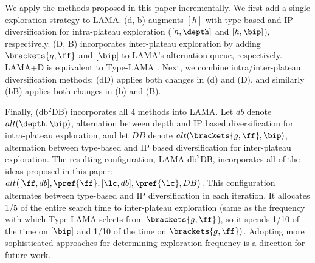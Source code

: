 
We apply the methods proposed in this paper incrementally.
We first add a single exploration strategy to LAMA.
(d, b) augments $[h]$ with type-based and IP diversification for intra-plateau exploration ($[h,\depth]$ and $[h,\bip]$), respectively.
(D, B) incorporates inter-plateau exploration by adding $\brackets{g,\ff}$ and $[\bip]$ to LAMA's alternation queue, respectively.
LAMA+D is equivalent to Type-LAMA \cite{xie14type}.
Next, we combine intra/inter-plateau diversification methods:
(dD) applies both changes in (d) and (D), and similarly (bB) applies both changes in (b) and (B).

Finally, (db$^2$DB) incorporates all 4 methods into LAMA.
Let $db$ denote $alt(\depth,\bip)$, alternation between depth and IP based diversification for intra-plateau exploration,
and let $DB$ denote $alt(\brackets{g,\ff},\bip)$, alternation between type-based and IP based diversification for inter-plateau exploration.
The resulting configuration,
LAMA-db$^2$DB, incorporates all of the ideas proposed in this paper: {\small $alt\big([\ff,db], \pref{\ff}, [\lc,db], \pref{\lc}, DB\big)$.}
This configuration alternates between type-based and IP diversification in each iteration.
It allocates 1/5 of the entire search time to inter-plateau exploration 
(same as the frequency with which Type-LAMA selects from $\brackets{g,\ff}$),
so it spends 1/10 of the time on $[\bip]$ and 1/10 of the time on $\brackets{g,\ff})$.
Adopting more sophisticated approaches for determining exploration frequency \cite{schulte2014balancing,nakhost2009monte} is a direction for future work.



